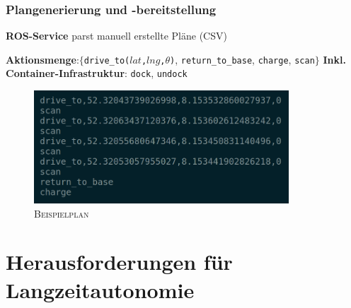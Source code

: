 \documentclass{beamer}
\newcommand{\code}[1]{\colorbox{light-gray}{\texttt{#1}}}
\begin{document}
\begin{frame}
  \frametitle{Plangenerierung und -bereitstellung}
  \textbf{ROS-Service} parst manuell erstellte Pläne (CSV)\newline
  
  \textbf{Aktionsmenge}:\newline $\{$\code{drive\_to($lat$,$lng$,$\theta$)}, \code{return\_to\_base}, \code{charge}, \code{scan}$\}$\newline
  \textbf{Inkl. Container-Infrastruktur}: \code{dock}, \code{undock}
  \begin{figure}[H]
    \centering
    \includegraphics[width=0.85\textwidth]{img/plan_example.png}
    \caption*{\textsc{Beispielplan}}
  \end{figure}
\end{frame}


\section{Herausforderungen für Langzeitautonomie}
\end{document}
